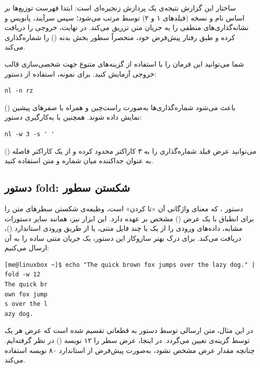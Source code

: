 ساختار این گزارش نتیجه‌ی یک پردازش زنجیره‌ای است: ابتدا فهرست توزیع‌ها بر اساس نام و نسخه (فیلدهای ۱ و ۲) توسط  مرتب می‌شود؛ سپس  سرآیند، پانویس و نشانه‌گذاری‌های منطقی را به جریان متن تزریق می‌کند. در نهایت،  خروجی را دریافت کرده و طبق رفتار پیش‌فرض خود، منحصراً سطور بخش بدنه () را شماره‌گذاری می‌کند.

شما می‌توانید این فرمان را با استفاده از گزینه‌های متنوع  جهت شخصی‌سازی قالب خروجی آزمایش کنید. برای نمونه، استفاده از دستور:

\begin{latin}
\begin{lstlisting}
nl -n rz
\end{lstlisting}
\end{latin}

باعث می‌شود شماره‌گذاری‌ها به‌صورت راست‌چین و همراه با صفرهای پیشین () نمایش داده شوند. همچنین با به‌کارگیری دستور:

\begin{latin}
\begin{lstlisting}
nl -w 3 -s ' '
\end{lstlisting}
\end{latin}

می‌توانید عرض فیلد شماره‌گذاری را به ۳ کاراکتر محدود کرده و از یک کاراکتر فاصله () به عنوان جداکننده میان شماره و متن استفاده کنید.

\subsection{دستور fold: شکستن سطور}

دستور ، که معنای واژگانی آن «تا کردن» است، وظیفه‌ی شکستن سطرهای متن را برای انطباق با یک عرض () مشخص بر عهده دارد. این ابزار نیز، همانند سایر دستورات مشابه، داده‌های ورودی را از یک یا چند فایل متنی، یا از طریق ورودی استاندارد ()، دریافت می‌کند. برای درک بهتر سازوکار این دستور، یک جریان متنی ساده را به آن ارسال می‌کنیم:

\begin{latin}
\begin{lstlisting}
[me@linuxbox ~]$ echo "The quick brown fox jumps over the lazy dog." | fold -w 12
The quick br
own fox jump
s over the l
azy dog.
\end{lstlisting}
\end{latin}

در این مثال، متن ارسالی توسط دستور  به قطعاتی تقسیم شده است که عرض هر یک توسط گزینه‌ی  تعیین می‌گردد. در اینجا، عرض سطر را ۱۲ نویسه () در نظر گرفته‌ایم. چنانچه مقدار عرض مشخص نشود،  به‌صورت پیش‌فرض از استاندارد ۸۰ نویسه استفاده می‌کند.

